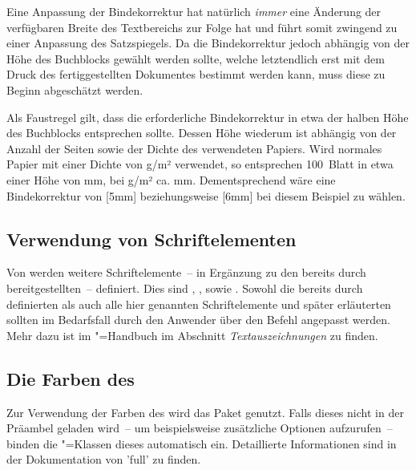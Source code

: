 Eine Anpassung der Bindekorrektur hat natürlich \emph{immer} eine Änderung der 
verfügbaren Breite des Textbereichs zur Folge hat und führt somit zwingend zu 
einer Anpassung des Satzspiegels. Da die Bindekorrektur jedoch abhängig von der 
Höhe des Buchblocks gewählt werden sollte, welche letztendlich erst mit dem 
Druck des fertiggestellten Dokumentes bestimmt werden kann, muss diese zu 
Beginn abgeschätzt werden.
%
\begin{Example}
Als Faustregel gilt, dass die erforderliche Bindekorrektur in etwa der halben 
Höhe des Buchblocks entsprechen sollte. Dessen Höhe wiederum ist abhängig von 
der Anzahl der Seiten sowie der Dichte des verwendeten Papiers. Wird normales 
Papier mit einer Dichte von \unit[80]{g/m²} verwendet, so entsprechen 100~Blatt 
in etwa einer Höhe von \unit[10]{mm}, bei \unit[100]{g/m²} ca. \unit[12]{mm}. 
Dementsprechend wäre eine Bindekorrektur von [5mm] beziehungsweise 
[6mm] bei diesem Beispiel zu wählen.
\end{Example}
%


\subsection{Verwendung von Schriftelementen}
\label{sec:fonts:elements}%
Von \TUDScript werden weitere Schriftelemente~-- in Ergänzung zu den bereits
durch \KOMAScript{} bereitgestellten~-- definiert. Dies sind , 
,  sowie . Sowohl die bereits 
durch \KOMAScript{} definierten als auch alle hier genannten Schriftelemente 
und später erläuterten sollten im Bedarfsfall durch den Anwender über den 
Befehl 
angepasst werden. Mehr dazu ist im \KOMAScript"=Handbuch \scrguide im 
Abschnitt \emph{Textauszeichnungen} zu finden.


\subsection{Die Farben des \CDs}
%
% 
Zur Verwendung der Farben des \CDs wird das Paket  
genutzt. Falls dieses nicht in der Präambel geladen wird~-- um beispielsweise 
zusätzliche Optionen aufzurufen~-- binden die \TUDScript"=Klassen dieses 
automatisch ein. Detaillierte Informationen sind in der Dokumentation von 
'full' zu finden.



